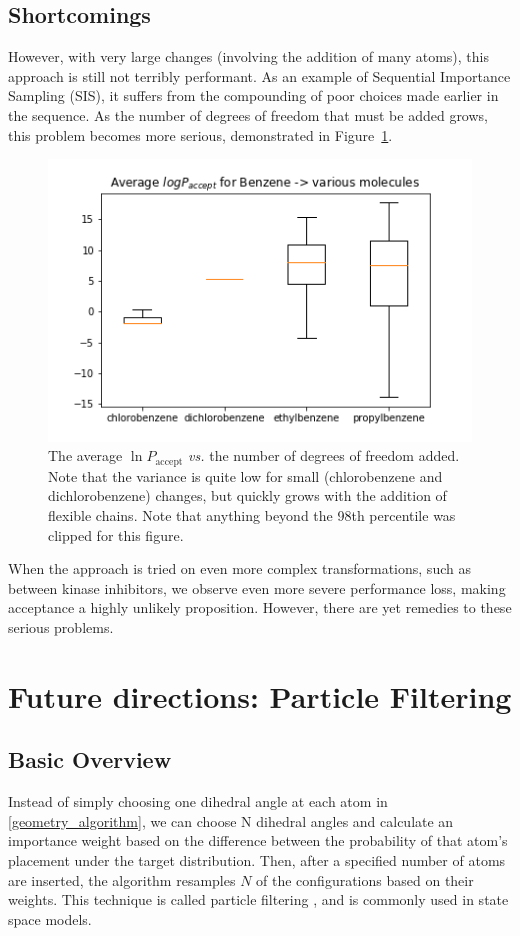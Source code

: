 \subsection{Shortcomings}
%
However, with very large changes (involving the addition of many atoms), this approach is still not terribly performant.
%
As an example of Sequential Importance Sampling (SIS), it suffers from the compounding of poor choices made earlier in the sequence.
%
As the number of degrees of freedom that must be added grows, this problem becomes more serious, demonstrated in Figure~\ref{fig:dof_added_worse}.
%
\begin{figure}
    \centering
    \includegraphics{dof_demo.png}
    \caption{The average $\ln P_\mathrm{accept}$ \emph{vs.} the number of degrees of freedom added. 
    Note that the variance is quite low for small (chlorobenzene and dichlorobenzene) changes, but quickly grows with the addition of flexible chains. Note that anything beyond the 98th percentile was clipped for this figure.}
    \label{fig:dof_added_worse}
\end{figure}
%
When the approach is tried on even more complex transformations, such as between kinase inhibitors, we observe even more severe performance loss, making acceptance a highly unlikely proposition.
%
However, there are yet remedies to these serious problems.
%
\section{Future directions: Particle Filtering}
%
\subsection{Basic Overview}
%
Instead of simply choosing one dihedral angle at each atom in \ref{geometry_algorithm}, we can choose N dihedral angles and calculate an importance weight based on the difference between the probability of that atom's placement under the target distribution.
%
Then, after a specified number of atoms are inserted, the algorithm resamples $N$ of the configurations based on their weights.
%
This technique is called particle filtering \cite{DelMoral1997,Henriksen2012}, and is commonly used in state space models.
%

